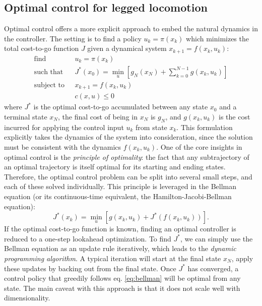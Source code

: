 \subsection{Optimal control for legged locomotion}
Optimal control offers a more explicit approach to embed the natural dynamics in the controller.
The setting is to find a policy $u_k = \pi(x_k)$  which minimizes the total cost-to-go function $J$ given a dynamical system $x_{k+1} = f(x_k, u_k)$:
\begin{align*}
\text{find } & \, \, u_k = \pi(x_k) \\
\text{such that } & \, \, J^*(x_0) = \min_u \left[g_N(x_N) + \sum_{k=0}^{N-1}g(x_k, u_k)\right] \\
\text{subject to } & \, \, x_{k+1} = f(x_k, u_k) \\
& \, \, c(x, u) \leq 0
\end{align*}
where $J^*$ is the optimal cost-to-go accumulated between any state $x_0$ and a terminal state $x_N$, the final cost of being in $x_N$ is $g_N$, and $g(x_k, u_k)$ is the cost incurred for applying the control input $u_k$ from state $x_k$.
This formulation explicitly takes the dynamics of the system into consideration, since the solution must be consistent with the dynamics $f(x_k, u_k)$.
One of the core insights in optimal control is the \emph{principle of optimality}: the fact that any subtrajectory of an optimal trajectory is itself optimal for its starting and ending states.
Therefore, the optimal control problem can be split into several small steps, and each of these solved individually.
This principle is leveraged in the Bellman equation (or its continuous-time equivalent, the Hamilton-Jacobi-Bellman equation):
\begin{equation}\label{eq:bellman}
J^*(x_k) = \min_u\left[g(x_k,u_k) + J^*(f(x_k, u_k)) \right].
\end{equation}
If the optimal cost-to-go function is known, finding an optimal controller is reduced to a one-step lookahead optimization.
To find $J^*$, we can simply use the Bellman equation as an update rule iteratively, which leads to the \emph{dynamic programming algorithm}. A typical iteration will start at the final state $x_N$, apply these updates by backing out from the final state. Once $J^*$ has converged, a control policy that greedily follows eq. \ref{eq:bellman} will be optimal from any state.
The main caveat with this approach is that it does not scale well with dimensionality. \par
